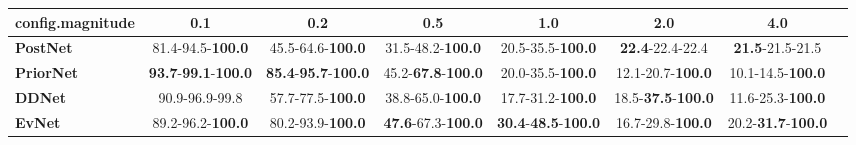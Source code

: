 \begin{tabular}{lccccccc}
\toprule
\textbf{config.magnitude} &                                         0.1 &                                         0.2 &                                0.5 &                                         1.0 &                                2.0 &                                4.0 \\
\midrule
\textbf{PostNet } &                    81.4-94.5-\textbf{100.0} &                    45.5-64.6-\textbf{100.0} &           31.5-48.2-\textbf{100.0} &                    20.5-35.5-\textbf{100.0} &            \textbf{22.4}-22.4-22.4 &            \textbf{21.5}-21.5-21.5 \\
\textbf{PriorNet} &  \textbf{93.7}-\textbf{99.1}-\textbf{100.0} &  \textbf{85.4}-\textbf{95.7}-\textbf{100.0} &  45.2-\textbf{67.8}-\textbf{100.0} &                    20.0-35.5-\textbf{100.0} &           12.1-20.7-\textbf{100.0} &           10.1-14.5-\textbf{100.0} \\
\textbf{DDNet   } &                              90.9-96.9-99.8 &                    57.7-77.5-\textbf{100.0} &           38.8-65.0-\textbf{100.0} &                    17.7-31.2-\textbf{100.0} &  18.5-\textbf{37.5}-\textbf{100.0} &           11.6-25.3-\textbf{100.0} \\
\textbf{EvNet   } &                    89.2-96.2-\textbf{100.0} &                    80.2-93.9-\textbf{100.0} &  \textbf{47.6}-67.3-\textbf{100.0} &  \textbf{30.4}-\textbf{48.5}-\textbf{100.0} &           16.7-29.8-\textbf{100.0} &  20.2-\textbf{31.7}-\textbf{100.0} \\
\bottomrule
\end{tabular}
